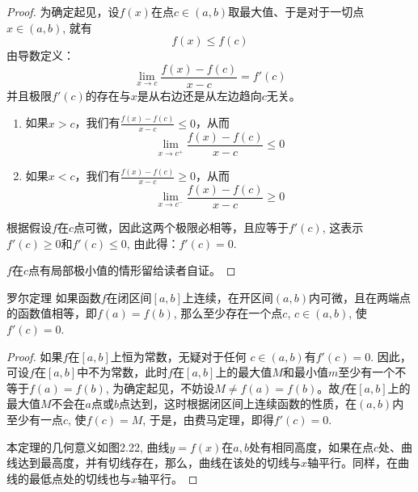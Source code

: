 \begin{proof}
    为确定起见，设$f(x)$在点$c\in (a,b)$取最大值、于是对于一切点$x\in (a,b)$, 就有
\[f (x) \le f (c) \]
由导数定义：
\[\lim_{x\to c}\frac{f (x) -f (c)}{x-c} =f' (c) \]
并且极限$f'(c)$的存在与$x$是从右边还是从左边趋向$c$无关。
\begin{enumerate}
    \item 如果$x>c$，我们有$\frac{f (x) -f (c)}{x-c}\le 0$，从而
\[\lim_{x\to c^+}\frac{f (x) -f (c)}{x-c}\le 0\]
\item 如果$x<c$，我们有$\frac{f (x) -f (c)}{x-c}\ge 0$，从而
\[\lim_{x\to c^-}\frac{f (x) -f (c)}{x-c}\ge 0\]
\end{enumerate}
根据假设$f$在$c$点可微，因此这两个极限必相等，且应等于$f'(c)$, 这表示$f'(c)\ge 0$和$f'(c)\le 0$, 由此得：$f' (c) =0$.

$f$在$c$点有局部极小值的情形留给读者自证。
\end{proof}

\begin{blk}
  {罗尔定理} 如果函数$f$在闭区间$[a,b]$上连续，在开区间$(a,b)$内可微，且在两端点的函数值相等，即$f(a)=f(b)$, 那么至少存在一个点$c$, $c\in (a,b)$, 使$f'(c)=0$.  
\end{blk}

\begin{proof}
如果$f$在$[a,b]$上恒为常数，无疑对于任何
$c\in (a,b)$有$f'(c)=0$. 因此，可设$f$在$[a,b]$中不为常数，此时$f$在$[a,b]$上的最大值$M$和最小值$m$至少有一个不等于$f(a)=f(b)$, 为确定起见，不妨设$M\ne f(a)=f(b)$。故$f$在$[a,b]$上的最大值$M$不会在$a$点或$b$点达到，这时根据闭区间上连续函数的性质，在$(a,b)$内至少有一点$c$, 使$f(c)=M$, 于是，由费马定理，即得$f'(c)=0$. 

本定理的几何意义如图2.22, 曲线$y=f(x)$在$a,b$处有相同高度，如果在点$c$处、曲线达到最高度，并有切线存在，那么，曲线在该处的切线与$x$轴平行。同样，在曲线的最低点处的切线也与$x$轴平行。
\end{proof}

